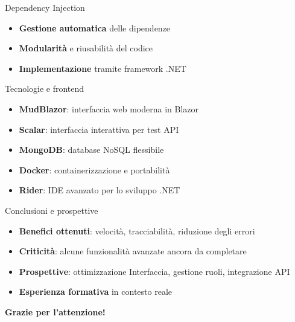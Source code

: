 \documentclass{beamer}
\begin{document}
\begin{frame}{Dependency Injection}
    \begin{itemize}
        \item \textbf{Gestione automatica} delle dipendenze
        \item \textbf{Modularità} e riusabilità del codice
        \item \textbf{Implementazione} tramite framework .NET
    \end{itemize}
\end{frame}

\begin{frame}{Tecnologie e frontend}
    \begin{itemize}
        \item \textbf{MudBlazor}: interfaccia web moderna in Blazor
        \item \textbf{Scalar}:  interfaccia interattiva per test API 
        \item \textbf{MongoDB}: database NoSQL flessibile
        \item \textbf{Docker}: containerizzazione e portabilità
        \item \textbf{Rider}: IDE avanzato per lo sviluppo .NET
    \end{itemize}
\end{frame}


\begin{frame}{Conclusioni e prospettive}
    \begin{itemize}
        \item \textbf{Benefici ottenuti}: velocità, tracciabilità, riduzione degli errori
        \item \textbf{Criticità}: alcune funzionalità avanzate ancora da completare
        \item \textbf{Prospettive}: ottimizzazione Interfaccia, gestione ruoli, integrazione API
        \item \textbf{Esperienza formativa} in contesto reale
    \end{itemize}
\end{frame}

 
\begin{emptyframe}
    \centering
    \textbf{Grazie per l'attenzione!}
\end{emptyframe}
\end{document}
